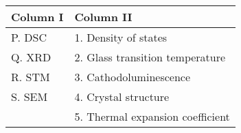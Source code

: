 \begin{tabular}{| p{3cm} | p{6cm} |}
    \hline
    \textbf{Column I} & \textbf{Column II} \\
    \hline
    P. DSC & 1. Density of states \\
    \hline
    Q. XRD & 2. Glass transition temperature \\
    \hline
    R. STM & 3. Cathodoluminescence \\
    \hline
    S. SEM & 4. Crystal structure \\
    \hline
    & 5. Thermal expansion coefficient \\
    \hline
\end{tabular}
